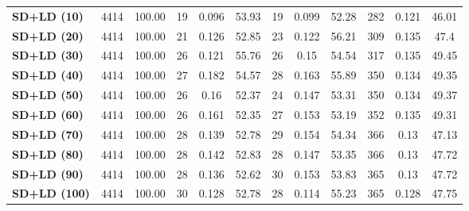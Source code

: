 \documentclass[12pt, a4paper, twoside]{report}
\begin{document}
\begin{table}[htbp]
{\begin{tabular}{|l|c|c|ccc|ccc|ccc|}
\hline
\textbf{SD+LD (10)} & 4414 & 100.00 & 19 & 0.096 & 53.93 & 19 & 0.099 & 52.28 & 282 & 0.121 & 46.01 \\
\textbf{SD+LD (20)} & 4414 & 100.00 & 21 & 0.126 & 52.85 & 23 & 0.122 & 56.21 & 309 & \cellcolor[HTML]{fef9e4}0.135 & 47.4 \\
\textbf{SD+LD (30)} & 4414 & 100.00 & 26 & 0.121 & 55.76 & 26 & 0.15 & 54.54 & 317 & 0.135 & \cellcolor[HTML]{fef9e4}49.45 \\
\textbf{SD+LD (40)} & 4414 & 100.00 & 27 & \cellcolor[HTML]{fef9e4}0.182 & \cellcolor[HTML]{fef9e4}54.57 & 28 & \cellcolor[HTML]{fef9e4}0.163 & \cellcolor[HTML]{fef9e4}55.89 & 350 & 0.134 & 49.35 \\
\textbf{SD+LD (50)} & 4414 & 100.00 & 26 & 0.16 & 52.37 & 24 & 0.147 & 53.31 & 350 & 0.134 & 49.37 \\
\textbf{SD+LD (60)} & 4414 & 100.00 & 26 & 0.161 & 52.35 & 27 & 0.153 & 53.19 & 352 & 0.135 & 49.31 \\
\textbf{SD+LD (70)} & 4414 & 100.00 & 28 & 0.139 & 52.78 & 29 & 0.154 & 54.34 & 366 & 0.13 & 47.13 \\
\textbf{SD+LD (80)} & 4414 & 100.00 & 28 & 0.142 & 52.83 & 28 & 0.147 & 53.35 & 366 & 0.13 & 47.72 \\
\textbf{SD+LD (90)} & 4414 & 100.00 & 28 & 0.136 & 52.62 & 30 & 0.153 & 53.83 & 365 & 0.13 & 47.72 \\
\textbf{SD+LD (100)} & 4414 & 100.00 & 30 & 0.128 & 52.78 & 28 & 0.114 & 55.23 & 365 & 0.128 & 47.75 \\
\hline
\end{tabular}
}
\end{table}
\end{document}

